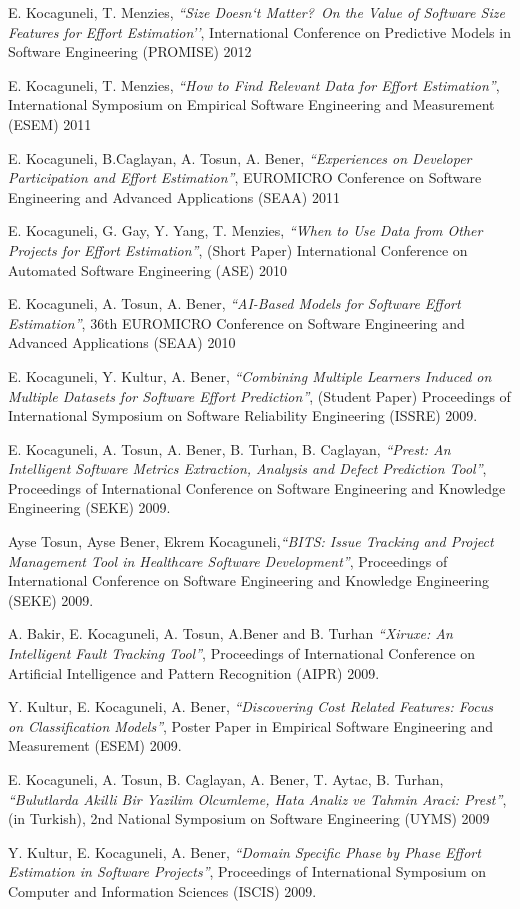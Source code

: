 \documentclass[margin]{res}
\begin{document}
\begin{resume}
\begin{list}{}{\leftmargin=0.5em}
\item E. Kocaguneli, T. Menzies, \textit{``Size Doesn`t Matter?~On the Value of Software Size Features for Effort Estimation''}, International Conference on Predictive Models in Software Engineering (PROMISE) 2012
\item E. Kocaguneli, T. Menzies, \textit{``How to Find Relevant Data for Effort Estimation''}, International Symposium on Empirical Software Engineering and Measurement (ESEM) 2011
\item E. Kocaguneli, B.Caglayan, A. Tosun, A. Bener, \textit{``Experiences on Developer Participation and Effort Estimation''}, EUROMICRO Conference on Software Engineering and Advanced Applications (SEAA) 2011
\item E. Kocaguneli, G. Gay, Y. Yang, T. Menzies, \textit{``When to Use Data from Other Projects for Effort Estimation''}, (Short Paper) International Conference on Automated Software Engineering (ASE) 2010
\item E. Kocaguneli, A. Tosun, A. Bener, \textit{``AI-Based Models for Software Effort Estimation''}, 36th EUROMICRO Conference on Software Engineering and Advanced Applications (SEAA) 2010
\item E. Kocaguneli, Y. Kultur, A. Bener, \textit{``Combining Multiple Learners Induced on Multiple Datasets for Software Effort Prediction''}, (Student Paper) Proceedings of International Symposium on Software Reliability Engineering (ISSRE) 2009.
\item E. Kocaguneli, A. Tosun, A. Bener, B. Turhan, B. Caglayan, \textit{``Prest: An Intelligent Software Metrics Extraction, Analysis and Defect Prediction Tool''}, Proceedings of International Conference on Software Engineering and Knowledge Engineering (SEKE) 2009.
\item Ayse Tosun, Ayse Bener, Ekrem Kocaguneli,\textit{``BITS: Issue Tracking and Project Management Tool in Healthcare Software Development''}, Proceedings of International Conference on Software Engineering and Knowledge Engineering (SEKE) 2009.
\item A. Bakir, E. Kocaguneli, A. Tosun, A.Bener and B. Turhan \textit{``Xiruxe: An Intelligent Fault Tracking Tool''}, Proceedings of International Conference on Artificial Intelligence and Pattern Recognition (AIPR) 2009.
\item Y. Kultur, E. Kocaguneli, A. Bener, \textit{``Discovering Cost Related Features: Focus on Classification Models''}, Poster Paper in Empirical Software Engineering and Measurement (ESEM) 2009.
\item E. Kocaguneli, A. Tosun, B. Caglayan, A. Bener, T. Aytac, B. Turhan, \textit{``Bulutlarda Akilli Bir Yazilim Olcumleme, Hata Analiz ve Tahmin Araci: Prest''}, (in Turkish), 2nd National Symposium on Software Engineering (UYMS) 2009
\item Y. Kultur, E. Kocaguneli, A. Bener, \textit{``Domain Specific Phase by Phase Effort Estimation in  Software Projects''}, Proceedings of International Symposium on Computer and Information Sciences (ISCIS) 2009.
\end{list}



\end{resume}
\end{document}
